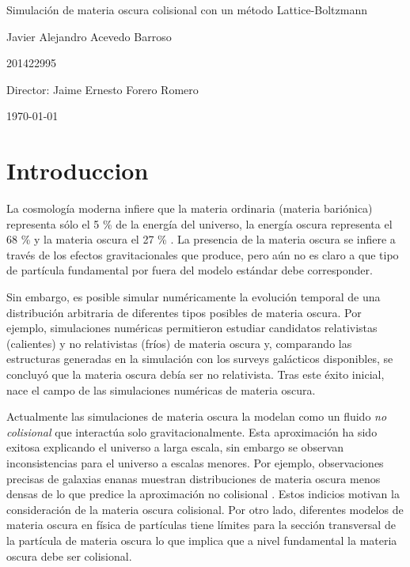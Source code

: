 \documentclass[12pt]{article}
\begin{document}
\begin{center}
\Huge
Simulación de materia oscura colisional con un método Lattice-Boltzmann

\vspace{3mm}
\Large Javier Alejandro Acevedo Barroso

\large
201422995


\vspace{2mm}
\Large
Director: Jaime Ernesto Forero Romero

\normalsize
\vspace{2mm}

\today
\end{center}


\normalsize
\newpage
\section{Introduccion}
La cosmología moderna infiere que la materia ordinaria (materia
bariónica) representa s\'olo el 5 \% de la energía del universo, la
energía oscura representa el 68 \% y la materia oscura el 27 \%
\cite{planckCitetion}.   
La presencia de la materia oscura se infiere a trav\'es de los efectos
gravitacionales que produce, pero a\'un no es claro a que tipo de
part\'icula fundamental por fuera del modelo est\'andar debe
corresponder. 

Sin embargo, es posible simular numéricamente la evoluci\'on temporal
de una distribuci\'on arbitraria de diferentes tipos posibles de
materia oscura. 
Por ejemplo,  simulaciones numéricas permitieron estudiar candidatos
relativistas (calientes) y no relativistas (fríos) de materia oscura
y, comparando las estructuras generadas en la simulación con los
surveys galácticos disponibles, se concluyó que la materia oscura
debía ser no relativista. Tras este éxito inicial, nace el campo de
las simulaciones numéricas de materia oscura\cite{aHistory}.

Actualmente las simulaciones de materia oscura la modelan 
como un fluido \emph{no colisional} que interact\'ua solo gravitacionalmente. 
Esta aproximaci\'on ha sido exitosa explicando el universo a larga
escala, sin embargo se observan inconsistencias para el universo a
escalas menores. 
Por ejemplo, observaciones precisas de galaxias enanas muestran distribuciones
de materia oscura menos densas de lo que predice la aproximaci\'on no
colisional \cite{beyondColl}.
Estos indicios motivan la consideraci\'on de la materia oscura
colisional. 
Por otro lado,  diferentes modelos de materia oscura en física de
partículas tiene límites para la sección transversal de la partícula
de materia oscura lo que implica que a nivel fundamental la materia
oscura debe ser colisional.
\end{document}
